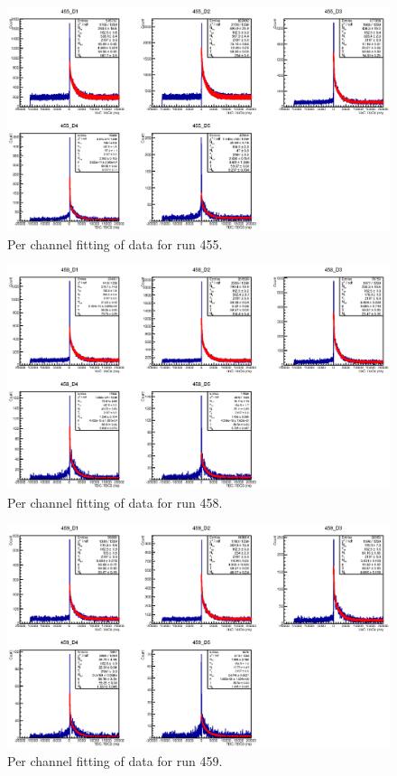 \begin{figure}[hptb] 
  \centering
    \includegraphics[scale=1.1, angle=90]{images/momentum_spectrum/455.eps}
  \caption{Per channel fitting of data for run 455.}
  \label{fig:images_momentum_spectrum_455}
\end{figure}
\begin{figure}[hptb] 
  \centering
    \includegraphics[scale=1.1, angle=90]{images/momentum_spectrum/458.eps}
  \caption{Per channel fitting of data for run 458.}
  \label{fig:images_momentum_spectrum_458}
\end{figure}
\begin{figure}[hptb] 
  \centering
    \includegraphics[scale=1.1, angle=90]{images/momentum_spectrum/459.eps}
  \caption{Per channel fitting of data for run 459.}
  \label{fig:images_momentum_spectrum_459}
\end{figure}
